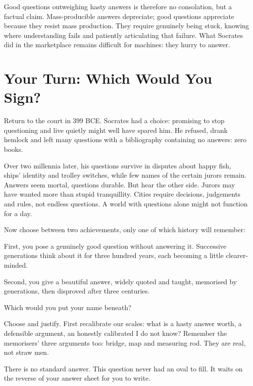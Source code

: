 Good questions outweighing hasty answers is therefore no consolation, but a factual claim. Mass-producible answers depreciate; good questions appreciate because they resist mass production. They require genuinely being stuck, knowing where understanding fails and patiently articulating that failure. What Socrates did in the marketplace remains difficult for machines: they hurry to answer.

\section{Your Turn: Which Would You Sign?}
Return to the court in 399 BCE. Socrates had a choice: promising to stop questioning and live quietly might well have spared him. He refused, drank hemlock and left many questions with a bibliography containing no answers: zero books.

Over two millennia later, his questions survive in disputes about happy fish, ships' identity and trolley switches, while few names of the certain jurors remain. Answers seem mortal, questions durable. But hear the other side. Jurors may have wanted more than stupid tranquillity. Cities require decisions, judgements and rules, not endless questions. A world with questions alone might not function for a day.

Now choose between two achievements, only one of which history will remember:

First, you pose a genuinely good question without answering it. Successive generations think about it for three hundred years, each becoming a little clearer-minded.

Second, you give a beautiful answer, widely quoted and taught, memorised by generations, then disproved after three centuries.

Which would you put your name beneath?

Choose and justify. First recalibrate our scales: what is a hasty answer worth, a defensible argument, an honestly calibrated I do not know? Remember the memorisers' three arguments too: bridge, map and measuring rod. They are real, not straw men.

There is no standard answer. This question never had an oval to fill. It waits on the reverse of your answer sheet for you to write.
